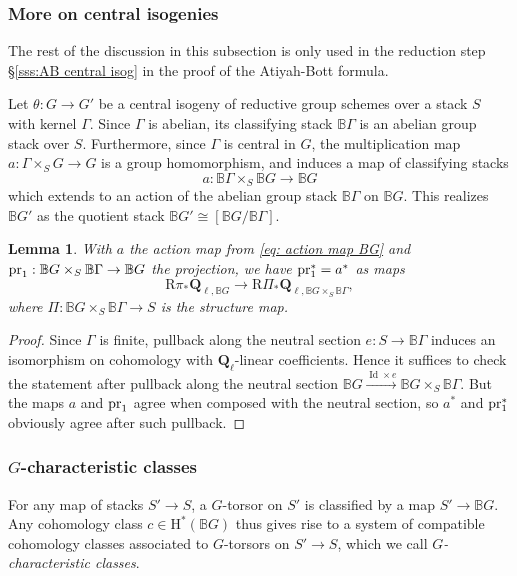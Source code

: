 \documentclass[reqno]{amsart}
\numberwithin{equation}{subsection}
\newtheorem{lemma}[subsubsection]{Lemma}
\theoremstyle{definition}
\def\BB{\mathbb{B}}
\newcommand\pr{\textup{pr}}
\newcommand{\Ql}{\Q_{\ell}}
\newcommand{\Q}{\mathbf{Q}}
\newcommand{\Qll}[1]{\Q_{\ell, #1}}
\newcommand{\co}{\colon}
\DeclareMathOperator{\Id}{Id}
\newcommand{\rH}{\ensuremath{\mathrm{H}}\xspace}
\newcommand{\rR}{\ensuremath{\mathrm{R}}\xspace}
\begin{document}
\subsubsection{More on central isogenies}\label{ssec: classifying space preliminaries} 

The rest of the discussion in this subsection is only used in the reduction step \S\ref{sss:AB central isog} in the proof of the Atiyah-Bott formula. 



Let $\theta \colon G \rightarrow G'$ be a central isogeny of reductive group schemes over a stack $S$ with kernel $\Gamma$.  Since $\Gamma$ is abelian, its classifying stack $\BB \Gamma$ is an abelian group stack over $S$. Furthermore, since $\Gamma$ is central in $G$, the multiplication map $a \co \Gamma \times_S G \rightarrow G$ is a group homomorphism, and induces a map of classifying stacks 
\begin{equation}\label{eq: action map BG}
a \co \BB \Gamma \times_S \BB G \rightarrow \BB G
\end{equation}
which extends to an action of the abelian group stack $\BB\Gamma$ on $\BB G$. This realizes $\BB G'$ as the quotient stack $\BB G' \cong [\BB G/\BB\Gamma]$. 



\begin{lemma}\label{lem: Gamma action on BG}
With $a$ the action map from \eqref{eq: action map BG} and $\pr_{1}: \BB G \times_S \BB \Gamma\to \BB G$ the projection, we have $\pr_1^* = a^*$ as maps 
\[
\rR \pi_* \Qll{\BB G}  \rightarrow \rR \Pi_* \Qll{\BB G \times_S \BB \Gamma},
\]
where $\Pi: \BB G \times_S \BB \Gamma\to S$ is the structure map.
\end{lemma}
\begin{proof}
Since $\Gamma$ is finite, pullback along the neutral section $e \co S \rightarrow \BB \Gamma$ induces an isomorphism on cohomology with $\Ql$-linear coefficients. Hence it suffices to check the statement after pullback along the neutral section $\BB G \xrightarrow{\Id \times e} \BB G \times_S \BB \Gamma$. But the maps $a$ and $\pr_1$ agree when composed with the neutral section, so $a^*$ and $\pr_1^*$ obviously agree after such pullback.
\end{proof}

 
\subsubsection{$G$-characteristic classes} 
For any map of stacks $S' \rightarrow S$, a $G$-torsor on $S'$ is classified by a map $S' \rightarrow \BB G$. Any cohomology class $c \in \rH^*(\BB G)$ thus gives rise to a system of compatible cohomology classes associated to $G$-torsors on $S' \rightarrow S$, which we call \emph{$G$-characteristic classes}. 
\end{document}
